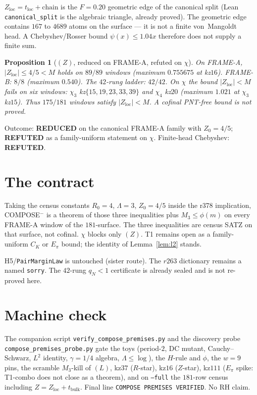 \documentclass[11pt]{article}
\newtheorem{prop}{Proposition}
\theoremstyle{remark}
\newcommand{\loc}{\mathrm{loc}}
\begin{document}
$Z_{\loc}=t_{\loc}+\mathrm{chain}$ is the $F=0.20$ geometric
edge of the canonical split (Lean \texttt{canonical\_split} is
the algebraic triangle, already proved).  The geometric edge
contains $167$ to $4689$ atoms on the surface --- it is not a
finite von~Mangoldt head.  A Chebyshev/Rosser bound
$\psi(x)\le 1.04x$ therefore does not supply a finite sum.

\begin{prop}[$(Z)$, reduced on FRAME-A, refuted on $\chi$]\label{prop:Z}
On FRAME-A, $\lvert Z_{\loc}\rvert\le 4/5<M$ holds on $89/89$
windows (maximum $0.755675$ at kz$16$).  FRAME-B: $8/8$
(maximum $0.540$).  The $42$-rung ladder: $42/42$.
On $\chi$ the bound $\lvert Z_{\loc}\rvert<M$ fails on six
windows:
$\chi_3$ kz$\{15,19,23,33,39\}$ and $\chi_4$ kz$20$
(maximum $1.021$ at $\chi_3$ kz$15$).
Thus $175/181$ windows satisfy $\lvert Z_{\loc}\rvert<M$.
A cofinal PNT-free bound is not proved.
\end{prop}

\noindent
Outcome: \textbf{REDUCED} on the canonical FRAME-A family with
$Z_0=4/5$; \textbf{REFUTED} as a family-uniform statement on
$\chi$.  Finite-head Chebyshev: \textbf{REFUTED}.

\section{The contract}\label{sec:contract}

Taking the census constants $R_0=4$, $\Lambda=3$, $Z_0=4/5$
inside the r378 implication, COMPOSE$^-$ is a theorem of those
three inequalities plus $M_3\le\phi(m)$ on every FRAME-A window
of the $181$-surface.  The three inequalities are census SATZ
on that surface, not cofinal.  $\chi$ blocks only $(Z)$.
T1 remains open as a family-uniform $C_K$ or $E_\pi$ bound;
the identity of Lemma~\ref{lem:l2} stands.

H5/\texttt{PairMarginLaw} is untouched (sister route).
The $r263$ dictionary remains a named \texttt{sorry}.
The $42$-rung $q_N<1$ certificate is already sealed and is not
re-proved here.

\section{Machine check}\label{sec:machine}

The companion script \texttt{verify\_compose\_premises.py} and
the discovery probe \texttt{compose\_premises\_probe.py} gate
the toys (period-$2$, DC mutant, Cauchy--Schwarz, $L^2$
identity, $\gamma=1/4$ algebra, $\Lambda\le\log$), the $H$-rule
and $\phi$, the $w=9$ pins, the scramble $M_3$-kill of $(L)$,
kz$37$ ($R$-star), kz$16$ ($Z$-star), kz$111$ ($E_\pi$ spike:
T1-combo does not close as a theorem), and on \texttt{--full}
the $181$-row census including $Z=Z_{\loc}+t_{\mathrm{bulk}}$.
Final line \texttt{COMPOSE PREMISES VERIFIED}.  No RH claim.
\end{document}
